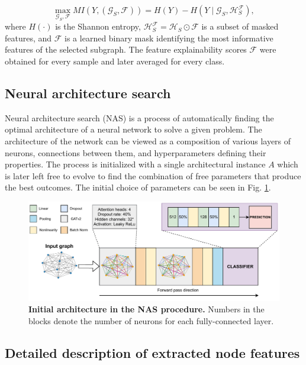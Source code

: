 \documentclass[a4paper,fleqn]{cas-sc}
\begin{document}
\begin{equation}\label{mutual_info}
    \max_{\mathcal{G}_{S}, \mathcal{F}} MI(Y, (\mathcal{G}_{S}, \mathcal{F})) = H(Y) - H(Y \mid \mathcal{G}_{S}, \mathcal{H}_{S}^\mathcal{F}),
\end{equation}
where $H(\cdot)$ is the Shannon entropy, $\mathcal{H}_{S}^\mathcal{F} = \mathcal{H}_{S} \odot \mathcal{F}$ is a subset of masked features, and $\mathcal{F}$ is a learned binary mask identifying the most informative features of the selected subgraph.
The feature explainability scores $\mathcal{F}$ were obtained for every sample and later averaged for every class. 

\subsection{Neural architecture search}
Neural architecture search (NAS) is a process of automatically finding the optimal architecture of a neural network to solve a given problem. The architecture of the network can be viewed as a composition of various layers of neurons, connections between them, and hyperparameters defining their properties. The process is initialized with a single architectural instance $A$ which is later left free to evolve to find the combination of free parameters that produce the best outcomes. The initial choice of parameters can be seen in Fig. \ref{figs1:initial-architecture}.

\begin{figure}[h]
    \centering
    \includegraphics[width=\linewidth]{figures/FigS1.pdf}
    \caption{\textbf{Initial architecture in the NAS procedure.} Numbers in the blocks denote the number of neurons for each fully-connected layer.}
    \label{figs1:initial-architecture}
\end{figure}

\subsection{Detailed description of extracted node features}
\label{chapter:appendix-2}
\end{document}
